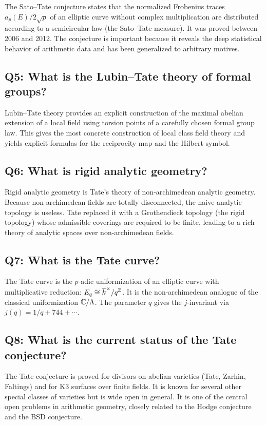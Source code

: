 The Sato--Tate conjecture states that the normalized Frobenius traces \(a_p(E)/2\sqrt{p}\) of an elliptic curve without complex multiplication are distributed according to a semicircular law (the Sato--Tate measure). It was proved between 2006 and 2012. The conjecture is important because it reveals the deep statistical behavior of arithmetic data and has been generalized to arbitrary motives.

\subsection*{Q5: What is the Lubin--Tate theory of formal groups?}

Lubin--Tate theory provides an explicit construction of the maximal abelian extension of a local field using torsion points of a carefully chosen formal group law. This gives the most concrete construction of local class field theory and yields explicit formulas for the reciprocity map and the Hilbert symbol.

\subsection*{Q6: What is rigid analytic geometry?}

Rigid analytic geometry is Tate's theory of non-archimedean analytic geometry. Because non-archimedean fields are totally disconnected, the naive analytic topology is useless. Tate replaced it with a Grothendieck topology (the rigid topology) whose admissible coverings are required to be finite, leading to a rich theory of analytic spaces over non-archimedean fields.

\subsection*{Q7: What is the Tate curve?}

The Tate curve is the \(p\)-adic uniformization of an elliptic curve with multiplicative reduction: \(E_q \cong \overline{k}^\times / q^{\mathbb{Z}}\). It is the non-archimedean analogue of the classical uniformization \(\mathbb{C}/\Lambda\). The parameter \(q\) gives the \(j\)-invariant via \(j(q) = 1/q + 744 + \cdots\).

\subsection*{Q8: What is the current status of the Tate conjecture?}

The Tate conjecture is proved for divisors on abelian varieties (Tate, Zarhin, Faltings) and for K3 surfaces over finite fields. It is known for several other special classes of varieties but is wide open in general. It is one of the central open problems in arithmetic geometry, closely related to the Hodge conjecture and the BSD conjecture.

